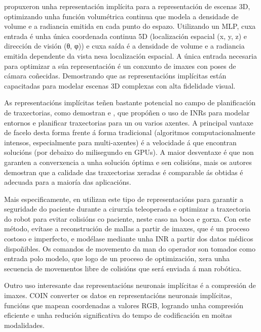 \cite{mildenhall2020nerfrepresentingscenesneural} propuxeron unha representación implícita para a representación de escenas 3D, 
 optimizando unha función volumétrica continua que modela a densidade de volume e a radiancia emitida en cada punto do espazo.
 Utilizando un MLP, cuxa entrada é unha única coordenada continua 5D (localización espacial (x, y, z) e dirección de visión (θ, φ)) 
 e cuxa saída é a densidade de volume e a radiancia emitida dependente da vista nesa localización espacial. 
A única entrada necesaria para optimizar a súa representación é un conxunto de imaxes con poses de cámara coñecidas. 
Demostrando que as representacións implícitas están capacitadas para modelar escenas 3D complexas con alta fidelidade visual.
 
As representacións implícitas teñen bastante potencial no campo de planificación de traxectorias, como demostran \cite{yu2024neuraltrajectorymodelimplicit} e \cite{trajectinr}, 
que propóñen o uso de INRs para modelar entornos e planificar traxectorias para un ou varios axentes.
A principal vantaxe de facelo desta forma frente á forma tradicional (algoritmos computacionalmente intensos, especialmente para multi-axentes) é a velocidade á que encontran solucións (por debaixo do milisegundo en GPUs).
A maior desventaxe é que non garanten a converxencia a unha solución óptima e sen colisións, mais os autores demostran que a calidade das traxectorias xeradas é comparable ás obtidas é adecuada para a maioría das aplicacións.

Mais especificamente, en \cite{teleoperatdrob} utilizan este tipo de representacións para garantir a seguridade do paciente durante a cirurxía teleoperada e optimizar a traxectoria do robot para evitar colisións co paciente, neste caso na boca e gorxa.
Con este método, evítase a reconstrución de mallas a partir de imaxes, que é un proceso costoso e imperfecto, e modélase mediante unha INR a partir dos datos médicos dispoñibles.
Os comandos de movemento da man do operador son tomados como entrada polo modelo, que logo de un proceso de optimización, xera unha secuencia de movementos libre de colisións que será enviada á man robótica.

Outro uso interesante das representacións neuronais implícitas é a compresión de imaxes. COIN \cite{coin} converter os datos en representacións neuronais implícitas, funcións que mapean coordenadas a valores RGB, logrando unha compresión eficiente e unha redución significativa do tempo de codificación en moitas modalidades.

